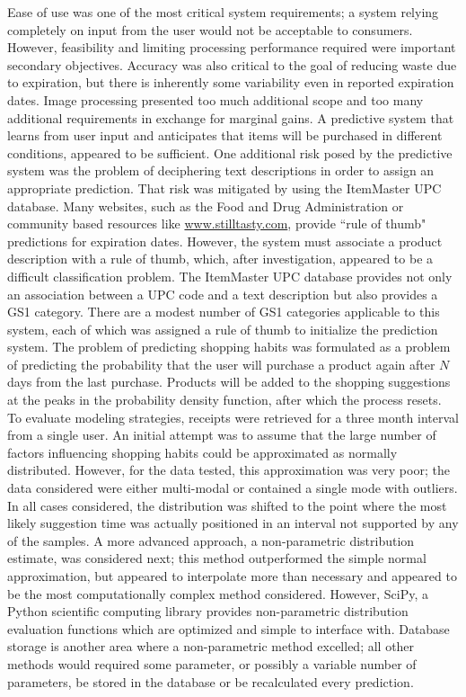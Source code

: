 \documentclass[11pt]{article} %
\begin{document}
\newline \quad \newline
Ease of use was one of the most critical system requirements; a system relying completely on input from the user would not be acceptable to consumers. However, feasibility and limiting processing performance required were important secondary objectives. Accuracy was also critical to the goal of reducing waste due to expiration, but there is inherently some variability even in reported expiration dates. Image processing presented too much additional scope and too many additional requirements in exchange for marginal gains. A predictive system that learns from user input and anticipates that items will be purchased in different conditions, appeared to be sufficient. One additional risk posed by the predictive system was the problem of deciphering text descriptions in order to assign an appropriate prediction. That risk was mitigated by using the ItemMaster UPC database. Many websites, such as the Food and Drug Administration or community based resources like \url{www.stilltasty.com}, provide ``rule of thumb"  predictions for expiration dates. However, the system must associate a product description with a rule of thumb, which, after investigation, appeared to be a difficult classification problem. The ItemMaster UPC database provides not only an association between a UPC code and a text description but also provides a GS1 category. There are a modest number of GS1 categories applicable to this system, each of which was assigned a rule of thumb to initialize the prediction system.
\newline \quad \newline
The problem of predicting shopping habits was formulated as a problem of predicting the probability that the user will purchase a product again after $N$ days from the last purchase. Products will be added to the shopping suggestions at the peaks in the probability density function, after which the process resets. To evaluate modeling strategies, receipts were retrieved for a three month interval from a single user. An initial attempt was to assume that the large number of factors influencing shopping habits could be approximated as normally distributed. However, for the data tested, this approximation was very poor; the data considered were either multi-modal or contained a single mode with outliers. In all cases considered, the distribution was shifted to the point where the most likely suggestion time was actually positioned in an interval not supported by any of the samples. A more advanced approach, a non-parametric distribution estimate, was considered next; this method outperformed the simple normal approximation, but appeared to interpolate more than necessary and appeared to be the most computationally complex method considered. However, SciPy, a Python scientific computing library provides non-parametric distribution evaluation functions which are optimized and simple to interface with. Database storage is another area where a non-parametric method excelled; all other methods would required some parameter, or possibly a variable number of parameters, be stored in the database or be recalculated every prediction. 
\end{document}
